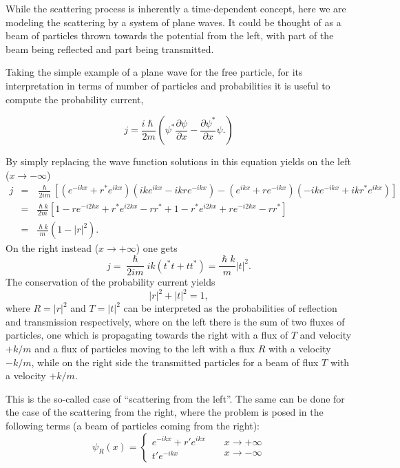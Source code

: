 While the scattering process is inherently a time-dependent concept, here we are modeling the scattering by a system of plane waves. It could be thought of as a beam of particles thrown towards the potential from the left, with part of the beam being reflected and part being transmitted.

Taking the simple example of a plane wave for the free particle, for its interpretation in terms of number of particles and probabilities it is useful to compute the probability current,

\[ j = \frac{i\hslash}{2m} (\psi^* \frac{\partial \psi}{\partial x} -  \frac{\partial \psi^*}{\partial x} \psi.)\]

By simply replacing the wave function solutions in this equation yields on the left ($x \rightarrow -\infty$)
\begin{eqnarray*}
j & = & \frac{\hslash}{2im} [(e^{-ikx}+r^* e^{ikx})(ike^{ikx}-ikr e^{-ikx})-(e^{ikx}+r e^{-ikx})(-ike^{-ikx}+ikr^* e^{ikx})] \\
& = & \frac{\hslash k}{2m} [ 1 -r e^{-i2kx} + r^* e^{i2kx} -rr^* +1 - r^*e^{i2kx} + re^{-i2kx} - r r^*] \\
& = & \frac{\hslash k}{m} (1 - |r|^2 ).
\end{eqnarray*}
On the right instead ($x \rightarrow +\infty$) one gets
\[ j = \frac{\hslash}{2im} ik ( t^*t + t t^* ) = \frac{\hslash k}{m} |t|^2.\]
The conservation of the probability current yields
\[|r|^2 + |t|^2 = 1,\]
where $R = |r|^2$ and $T = |t|^2$ can be interpreted as the probabilities of reflection and transmission respectively, where on the left there is the sum of two fluxes of particles, one which is propagating towards the right with a flux of $T$ and velocity $+k/m$ and a flux of particles moving to the left with a flux $R$ with a velocity $-k/m$, while on the right side the transmitted particles for a beam of flux $T$ with a velocity $+k/m$. 

This is the so-called case of ``scattering from the left''. The same can be done for the case of the scattering from the right, where the problem is posed in the following terms (a beam of particles coming from the right):
\begin{equation}
\psi_R(x) = \left \{ 
    \begin{matrix}
 e^{-ikx} + r' e^{ikx}  \\
 t' e^{-ikx} 
\end{matrix}
    \right . \; \; \; \; 
    \begin{matrix}
 x \rightarrow +\infty  \\
 x \rightarrow -\infty 
\end{matrix}
\end{equation}

